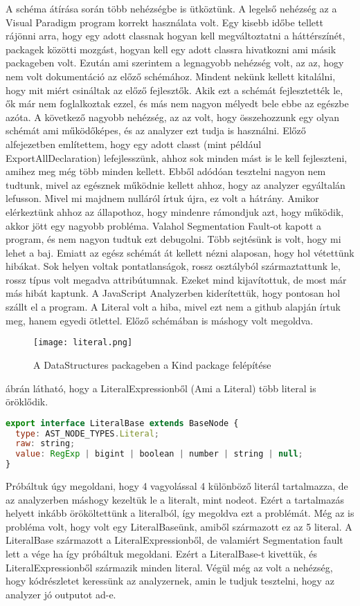 \noindent

A schéma átírása során több nehézségbe is ütköztünk.
A legelső nehézség az a Visual Paradigm program korrekt használata volt.
Egy kisebb időbe tellett rájönni arra, hogy egy adott classnak hogyan kell megváltoztatni a háttérszínét, packagek közötti mozgást, hogyan kell egy adott classra hivatkozni ami másik packageben volt.
Ezután ami szerintem a legnagyobb nehézség volt, az az, hogy nem volt dokumentáció az előző schémához.
Mindent nekünk kellett kitalálni, hogy mit miért csináltak az előző fejlesztők. Akik ezt a schémát fejlesztették le, ők már nem foglalkoztak ezzel, és más nem nagyon mélyedt bele ebbe az egészbe azóta.
A következő nagyobb nehézség, az az volt, hogy összehozzunk egy olyan schémát ami működőképes, és az analyzer ezt tudja is használni.
Előző alfejezetben említettem, hogy egy adott classt (mint például ExportAllDeclaration) lefejlesszünk, ahhoz sok minden mást is le kell fejleszteni, amihez meg még több minden kellett.
Ebből adódóan tesztelni nagyon nem tudtunk, mivel az egésznek működnie kellett ahhoz, hogy az analyzer egyáltalán lefusson.
Mivel mi majdnem nulláról írtuk újra, ez volt a hátrány.
Amikor elérkeztünk ahhoz az állapothoz, hogy mindenre rámondjuk azt, hogy működik, akkor jött egy nagyobb probléma.
Valahol Segmentation Fault-ot kapott a program, és nem nagyon tudtuk ezt debugolni.
Több sejtésünk is volt, hogy mi lehet a baj. Emiatt az egész schémát át kellett nézni alaposan, hogy hol vétettünk hibákat.
Sok helyen voltak pontatlanságok, rossz osztályból származtattunk le, rossz típus volt megadva attribútumnak. Ezeket mind kijavítottuk, de most már más hibát kaptunk.
A JavaScript Analyzerben kiderítettük, hogy pontosan hol szállt el a program.
A Literal volt a hiba, mivel ezt nem a github alapján írtuk meg, hanem egyedi ötlettel. Előző schémában is máshogy volt megoldva.
\begin{figure}[!htbp]
      \caption{A DataStructures packageben a Kind package felépítése}\label{fig:literal}
      \centering
      \texttt{[image: literal.png]}
\end{figure}

 ábrán látható, hogy a LiteralExpressionből (Ami a Literal) több literal is öröklődik.
\begin{lstlisting}[caption={Literal},label={lst:asg_file_literal}, language={JavaScript}]
export interface LiteralBase extends BaseNode {
  type: AST_NODE_TYPES.Literal;
  raw: string;
  value: RegExp | bigint | boolean | number | string | null;
}
\end{lstlisting}
Próbáltuk úgy megoldani, hogy 4 vagyolással 4 különböző literál tartalmazza, de az analyzerben máshogy kezeltük le a literalt, mint nodeot.
Ezért a tartalmazás helyett inkább örököltettünk a literalból, így megoldva ezt a problémát.
Még az is probléma volt, hogy volt egy LiteralBaseünk, amiből származott ez az 5 literal. A LiteralBase származott a LiteralExpressionből, de valamiért Segmentation fault lett a vége ha így próbáltuk megoldani.
Ezért a LiteralBase-t kivettük, és LiteralExpressionből származik minden literal.
Végül még az volt a nehézség, hogy kódrészletet keressünk az analyzernek, amin le tudjuk tesztelni, hogy az analyzer jó outputot ad-e.

